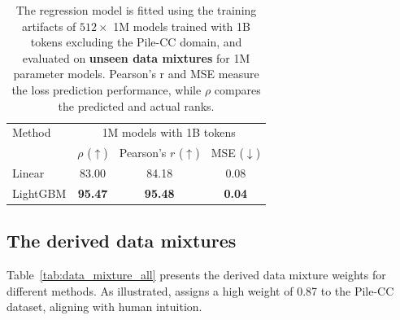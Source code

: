 \begin{table}[htbp]
    \centering
    \small
    \caption{The regression model is fitted using the training artifacts of $512 \times$ 1M models trained with 1B tokens excluding the Pile-CC domain, and evaluated on \textbf{unseen data mixtures} for 1M parameter models. Pearson's r and MSE measure the loss prediction performance, while $\rho$ compares the predicted and actual ranks.}
    \label{tab:linear_vs_lightgbm_1M_OOD}
    \begin{tabular}{lccc}
        \toprule
        {Method} & \multicolumn{3}{c}{1M models with 1B tokens}\\
        \cmidrule(r){1-1} \cmidrule(lr){2-4}
        & $\rho$ ($\uparrow$) & 
        Pearson's $r$ ($\uparrow$) & MSE ($\downarrow$) \\
        \midrule
        Linear  & 83.00 & 84.18 & 0.08  \\
        LightGBM & \textbf{95.47} & \textbf{95.48} & \textbf{0.04} \\
        \bottomrule
    \end{tabular}
\end{table}

\subsection{The derived data mixtures}

Table~\ref{tab:data_mixture_all} presents the derived data mixture weights for different methods. As illustrated, \ourmethod assigns a high weight of 0.87 to the Pile-CC dataset, aligning with human intuition.


